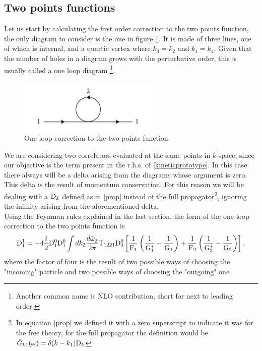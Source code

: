 \subsection{Two points functions}
Let us start by calculating the first order correction to the two points function, the only diagram to consider is the one in figure \ref{fig:oneloop2}. It is made 
of three lines, one of which is internal, and a quartic vertex where $k_3 = k_2$ and $k_1 = k_4$. Given that the number of holes in a diagram grows with the perturbative order, this is usually called a one loop diagram
\footnote{Another common name is NLO contribution, short for next to leading order.}.\\
\begin{figure}[ht]
    \centering
    \includegraphics[width=0.6\textwidth]{images/2pointsoneloop.jpg}
    \caption{One loop correction to the two points function.}
    \label{fig:oneloop2}
\end{figure}
We are considering two correlators evaluated at the same points in $k$-space, since our objective is the term present in the r.h.s. of \eqref{kineticprototype}. 
In this case there always will be a delta arising from the diagrams whose argument is zero. This delta is the result of momentum conservation.
For this reason we will be dealing with a $\mathrm{D}_k$ defined as in \eqref{prop} instead of the full propagator\footnote{In equation \eqref{prop} we defined it 
with a zero superscript to indicate it was for the free theory, for the full propagator the definition would be $\tilde{G}_{k1}(\omega^{})=\delta(k-k_1)\mathrm{D}_k$},
ignoring the infinity arising from the aforementioned delta. \\
Using the Feynman rules explained in the last section, the form of the one loop correction to the two points function is
\begin{equation}
    \mathrm{D}_1^{1} = -4\frac{i}{2} \mathrm{D}^0_1\mathrm{D}^0_1 \int dk_2\frac{d\tilde{\omega}^{}_2}{2\pi} \mathrm{T}_{1221}\mathrm{D}^0_2\left[\frac{1}{\mathrm{F}_1}\left( \frac{1}{\mathrm{G}_1^*} - \frac{1}{\mathrm{G}_1}\right) +
    \frac{1}{\mathrm{F}_2}\left( \frac{1}{\mathrm{G}_2^*} - \frac{1}{\mathrm{G}_2}\right) 
    \right],
\end{equation}
where the factor of four is the result of two possible ways of choosing the "incoming" particle and two possible ways of choosing the "outgoing" one.
